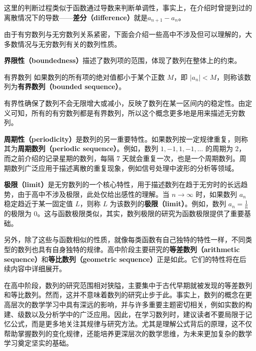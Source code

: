 这里的判断过程类似于函数通过导数来判断单调性，事实上，在介绍时曾提到过的离散情况下的导数——\textbf{差分（difference）}就是$a_{n+1}-a_n$。

由于有穷数列与无穷数列关系紧密，下面会介绍一些高中不涉及但可以理解的，大多数情况与无穷数列有关的数列性质。

\textbf{界限性（boundedness）}描述了数列项的范围，体现了数列在整体上的约束。

\begin{definition}{有界数列}
如果数列的所有项的绝对值都小于某个正数 $M$，即 $\lvert a_n \rvert < M$，则称该数列为\textbf{有界数列（bounded sequence）}。
\end{definition}

有界性确保了数列不会无限增大或减小，反映了数列在某一区间内的稳定性。由定义可知，所有的有穷数列都是有界数列，所以这个概念更多地是用来描述无穷数列。

\textbf{周期性（periodicity）}是数列的另一重要特性。如果数列按一定规律重复，则称其为\textbf{周期数列（periodic sequence）}。例如，数列 $1, -1, 1, -1, \dots$ 的周期为 $2$，而之前介绍的记录星期的数列，每隔 7 天就会重复一次，也是一个周期数列。周期数列广泛应用于描述离散的重复现象，例如信号处理中波形的分析等领域。

\textbf{极限（limit）}是无穷数列的一个核心特性，用于描述数列在趋于无穷时的长远趋势，由于高中不涉及极限，此处仅给出感性的理解。当 $n \to \infty$ 时，如果数列 ${a_n}$ 稳定趋近于某一固定值 $L$，则称 $L$ 为该数列的\textbf{极限（limit）}。例如，数列 $a_n = \frac{1}{n}$ 的极限为 $0$。这与函数极限类似，其实，数列极限的研究为函数极限提供了重要基础。

另外，除了这些与函数相似的性质，就像每类函数有自己独特的特性一样，不同类型的数列也具有自身独特的规律。高中阶段主要研究的\textbf{等差数列（arithmetic sequence）}和\textbf{等比数列（geometric sequence）}正是如此。它们的特性将在后续内容中详细展开。

在高中阶段，数列的研究范围相对狭隘，主要集中于古代早期就被发现的等差数列和等比数列。然而，这并不意味着数列的研究止步于此。事实上，数列的概念在更高层次的数学学习中具有深远的影响，并与许多重要主题密切相关，例如实数的构建、级数以及分析学中的广泛应用。因此，在学习数列时，建议读者不要局限于记忆公式，而是更多地关注其规律与研究方法。尤其是理解公式背后的原理，这不仅帮助掌握数列的变化规律，还能培养更深层次的数学思维，为未来更加复杂的数学学习奠定坚实的基础。